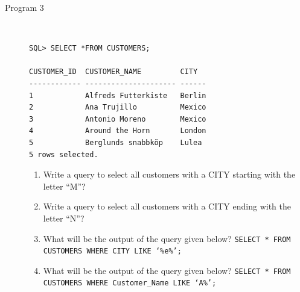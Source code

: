 \documentclass[11pt,a4paper]{article}
\def\AnswerBox{\fbox{\begin{minipage}{4in}\hfill\vspace{0.5in}\end{minipage}}}
\begin{document}
\begin{description}
\item [Program 3]\ 
\begin{verbatim}
SQL> SELECT *FROM CUSTOMERS;

CUSTOMER_ID  CUSTOMER_NAME         CITY
------------ --------------------- ------
1            Alfreds Futterkiste   Berlin
2            Ana Trujillo          Mexico 
3            Antonio Moreno        Mexico 
4            Around the Horn       London
5            Berglunds snabbköp    Lulea
5 rows selected.
\end{verbatim}

\begin{enumerate}[label=\bfseries Q\arabic*:]\itemsep10pt
\item Write a query to select all customers with a CITY starting with the letter ``M''?
\item Write a query to select all customers with a CITY ending with the letter ``N''?
\item What will be the output of the query given below?\newline
\texttt{SELECT * FROM CUSTOMERS WHERE CITY LIKE `\%e\%';}
\item What will be the output of the query given below?\newline
\texttt{SELECT * FROM CUSTOMERS WHERE Customer\_Name LIKE `A\%';}
\end{enumerate}

\end{description}
\end{document}
